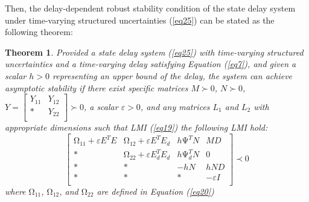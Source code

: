 \documentclass[a4paper]{cas-sc}
\newtheorem{theorem}{Theorem}
\begin{document}
Then, the delay-dependent robust stability condition of the state delay system under time-varying structured uncertainties (\ref{eq25}) can be stated as the following theorem:
\begin{theorem}
  \label{theorem7}
  Provided a state delay system (\ref{eq25}) with time-varying structured uncertainties and a time-varying delay satisfying Equation (\ref{eq7}), and given a scalar $h>0$ representing an upper bound of the delay, the system can achieve asymptotic stability if there exist specific matrices $M\succ0$, $N\succ0$, $Y=\left[\begin{matrix}Y_{11}&Y_{12}\\\ast&Y_{22}\\\end{matrix}\right]\succ0$, a scalar $\varepsilon>0$, and any matrices $L_1$ and $L_2$ with appropriate dimensions such that LMI (\ref{eq19}) the following LMI hold:
\begin{equation}
  \left[\begin{matrix}\mathrm{\Omega}_{11}+\varepsilon E^TE&\mathrm{\Omega}_{12}+\varepsilon E^TE_d&h\mathrm{\Psi}^TN&MD\\\ast&\mathrm{\Omega}_{22}+\varepsilon E_d^TE_d&h\mathrm{\Psi}_d^TN&0\\\ast&\ast&-hN&hND\\\ast&\ast&\ast&-\varepsilon I\\\end{matrix}\right]\prec0
      \label{eq28}
\end{equation} 
  where $\mathrm{\Omega}_{11}$, $\mathrm{\Omega}_{12}$, and $\mathrm{\Omega}_{22}$ are defined in Equation (\ref{eq20})
  
\end{theorem}
\end{document}
